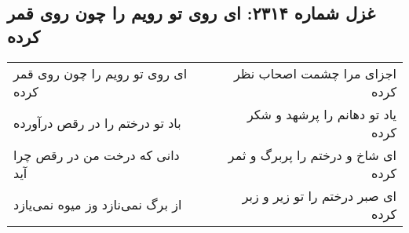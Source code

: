 \begin{center}
\section*{غزل شماره ۲۳۱۴: ای روی تو رویم را چون روی قمر کرده}
\label{sec:2314}
\begin{longtable}{l p{0.5cm} r}
ای روی تو رویم را چون روی قمر کرده
&&
اجزای مرا چشمت اصحاب نظر کرده
\\
باد تو درختم را در رقص درآورده
&&
یاد تو دهانم را پرشهد و شکر کرده
\\
دانی که درخت من در رقص چرا آید
&&
ای شاخ و درختم را پربرگ و ثمر کرده
\\
از برگ نمی‌نازد وز میوه نمی‌یازد
&&
ای صبر درختم را تو زیر و زبر کرده
\\
\end{longtable}
\end{center}
